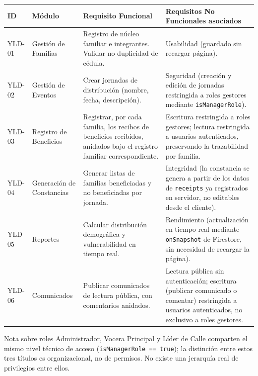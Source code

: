 \documentclass[14pt,a4paper,oneside]{extbook}
\begin{document}
\begin{table}[htbp]
\centering
\small
\begin{tabular}{p{} p{} p{} p{}}
\toprule
\textbf{ID} & \textbf{Módulo} & \textbf{Requisito Funcional} & \textbf{Requisitos No Funcionales asociados} \\
\midrule
YLD-01 & Gestión de Familias & Registro de núcleo familiar e integrantes. Validar no duplicidad de cédula. & Usabilidad (guardado sin recargar página). \\
\addlinespace
YLD-02 & Gestión de Eventos & Crear jornadas de distribución (nombre, fecha, descripción). & Seguridad (creación y edición de jornadas restringida a roles gestores mediante \texttt{isManagerRole}). \\
\addlinespace
YLD-03 & Registro de Beneficios & Registrar, por cada familia, los recibos de beneficios recibidos, anidados bajo el registro familiar correspondiente. & Escritura restringida a roles gestores; lectura restringida a usuarios autenticados, preservando la trazabilidad por familia. \\
\addlinespace
YLD-04 & Generación de Constancias & Generar listas de familias beneficiadas y no beneficiadas por jornada. & Integridad (la constancia se genera a partir de los datos de \texttt{receipts} ya registrados en servidor, no editables desde el cliente). \\
\addlinespace
YLD-05 & Reportes & Calcular distribución demográfica y vulnerabilidad en tiempo real. & Rendimiento (actualización en tiempo real mediante \texttt{onSnapshot} de Firestore, sin necesidad de recargar la página). \\
\addlinespace
YLD-06 & Comunicados & Publicar comunicados de lectura pública, con comentarios anidados. & Lectura pública sin autenticación; escritura (publicar comunicado o comentar) restringida a usuarios autenticados, no exclusivo a roles gestores. \\
\bottomrule
\end{tabular}
\end{table}

\begin{bitacorafield}{Nota sobre roles}
Administrador, Vocera Principal y Líder de Calle comparten el mismo nivel técnico de acceso
(\texttt{isManagerRole == true}); la distinción entre estos tres títulos es organizacional, no de
permisos. No existe una jerarquía real de privilegios entre ellos.
\end{bitacorafield}
\end{document}
